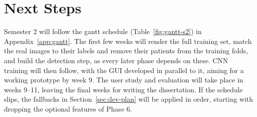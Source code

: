 \section{Next Steps}
\label{sec:next-steps}
 Semester 2 will follow the gantt schedule (Table~\ref{fig:gantt-s2}) in Appendix~\ref{app:gantt}. The first few weeks will render the full training set, match the real images to their labels and remove their patients from the training folds, and build the detection step, as every later phase depends on these. CNN training will then follow, with the GUI developed in parallel to it, aiming for a working prototype by week 9. The user study and evaluation will take place in weeks 9--11, leaving the final weeks for writing the dissertation. If the schedule slips, the fallbacks in Section~\ref{sec:dev-plan} will be applied in order, starting with dropping the optional features of Phase 6.